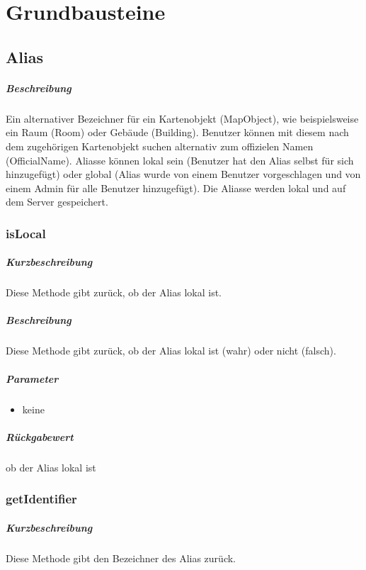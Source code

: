 \chapter{Grundbausteine}

\section{Alias}
\paragraph*{Beschreibung}
Ein alternativer Bezeichner für ein Kartenobjekt (MapObject), wie beispielsweise ein Raum (Room) oder Gebäude (Building).
Benutzer können mit diesem nach dem zugehörigen Kartenobjekt suchen alternativ zum offizielen Namen (OfficialName).
Aliasse können lokal sein (Benutzer hat den Alias selbst für sich hinzugefügt) oder global (Alias wurde von einem Benutzer vorgeschlagen und von einem Admin für alle Benutzer hinzugefügt).
Die Aliasse werden lokal und auf dem Server gespeichert.

\subsection{isLocal}%
\paragraph*{Kurzbeschreibung}
Diese Methode gibt zurück, ob der Alias lokal ist.
\paragraph*{Beschreibung}
Diese Methode gibt zurück, ob der Alias lokal ist (wahr) oder nicht (falsch).
\paragraph*{Parameter}
\begin{itemize}
    \item keine
\end{itemize}
\paragraph*{Rückgabewert}
ob der Alias lokal ist

\subsection{getIdentifier}%
\paragraph*{Kurzbeschreibung}
Diese Methode gibt den Bezeichner des Alias zurück.
